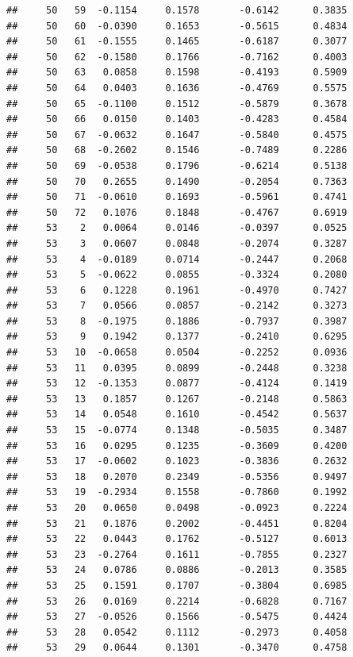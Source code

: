 \documentclass[
]{article}
\begin{document}
\begin{verbatim}
##     50   59  -0.1154     0.1578       -0.6142      0.3835  
##     50   60  -0.0390     0.1653       -0.5615      0.4834  
##     50   61  -0.1555     0.1465       -0.6187      0.3077  
##     50   62  -0.1580     0.1766       -0.7162      0.4003  
##     50   63   0.0858     0.1598       -0.4193      0.5909  
##     50   64   0.0403     0.1636       -0.4769      0.5575  
##     50   65  -0.1100     0.1512       -0.5879      0.3678  
##     50   66   0.0150     0.1403       -0.4283      0.4584  
##     50   67  -0.0632     0.1647       -0.5840      0.4575  
##     50   68  -0.2602     0.1546       -0.7489      0.2286  
##     50   69  -0.0538     0.1796       -0.6214      0.5138  
##     50   70   0.2655     0.1490       -0.2054      0.7363  
##     50   71  -0.0610     0.1693       -0.5961      0.4741  
##     50   72   0.1076     0.1848       -0.4767      0.6919  
##     53    2   0.0064     0.0146       -0.0397      0.0525  
##     53    3   0.0607     0.0848       -0.2074      0.3287  
##     53    4  -0.0189     0.0714       -0.2447      0.2068  
##     53    5  -0.0622     0.0855       -0.3324      0.2080  
##     53    6   0.1228     0.1961       -0.4970      0.7427  
##     53    7   0.0566     0.0857       -0.2142      0.3273  
##     53    8  -0.1975     0.1886       -0.7937      0.3987  
##     53    9   0.1942     0.1377       -0.2410      0.6295  
##     53   10  -0.0658     0.0504       -0.2252      0.0936  
##     53   11   0.0395     0.0899       -0.2448      0.3238  
##     53   12  -0.1353     0.0877       -0.4124      0.1419  
##     53   13   0.1857     0.1267       -0.2148      0.5863  
##     53   14   0.0548     0.1610       -0.4542      0.5637  
##     53   15  -0.0774     0.1348       -0.5035      0.3487  
##     53   16   0.0295     0.1235       -0.3609      0.4200  
##     53   17  -0.0602     0.1023       -0.3836      0.2632  
##     53   18   0.2070     0.2349       -0.5356      0.9497  
##     53   19  -0.2934     0.1558       -0.7860      0.1992  
##     53   20   0.0650     0.0498       -0.0923      0.2224  
##     53   21   0.1876     0.2002       -0.4451      0.8204  
##     53   22   0.0443     0.1762       -0.5127      0.6013  
##     53   23  -0.2764     0.1611       -0.7855      0.2327  
##     53   24   0.0786     0.0886       -0.2013      0.3585  
##     53   25   0.1591     0.1707       -0.3804      0.6985  
##     53   26   0.0169     0.2214       -0.6828      0.7167  
##     53   27  -0.0526     0.1566       -0.5475      0.4424  
##     53   28   0.0542     0.1112       -0.2973      0.4058  
##     53   29   0.0644     0.1301       -0.3470      0.4758  

\end{verbatim}
\end{document}
